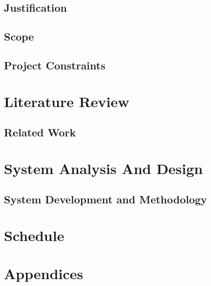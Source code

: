 \documentclass{report}
\begin{document}
\subsection{Justification}


\subsection{Scope}


\subsection{Project Constraints}



\section{Literature Review}

\subsection{Related Work}

\section{System Analysis And Design}

\subsection{System Development and Methodology}

\section{Schedule}

%

\section{Appendices}



\end{document}
